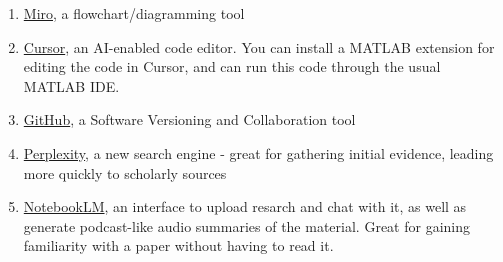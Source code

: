 \documentclass{article}
\begin{document}
\begin{enumerate}
\item \href{https://miro.com/}{Miro}, a flowchart/diagramming tool
\item \href{https://www.cursor.com/}{Cursor}, an AI-enabled code editor. You can install a MATLAB extension for editing the code in Cursor, and can run this code through the usual MATLAB IDE.
\item \href{https://www.github.com}{GitHub}, a Software Versioning and Collaboration tool
\item \href{https://www.perplexity.ai/}{Perplexity}, a new search engine - great for gathering initial evidence, leading more quickly to scholarly sources
\item \href{https://notebooklm.google.com/}{NotebookLM}, an interface to upload resarch and chat with it, as well as generate podcast-like audio summaries of the material. Great for gaining familiarity with a paper without having to read it.
\end{enumerate}
\end{document}
